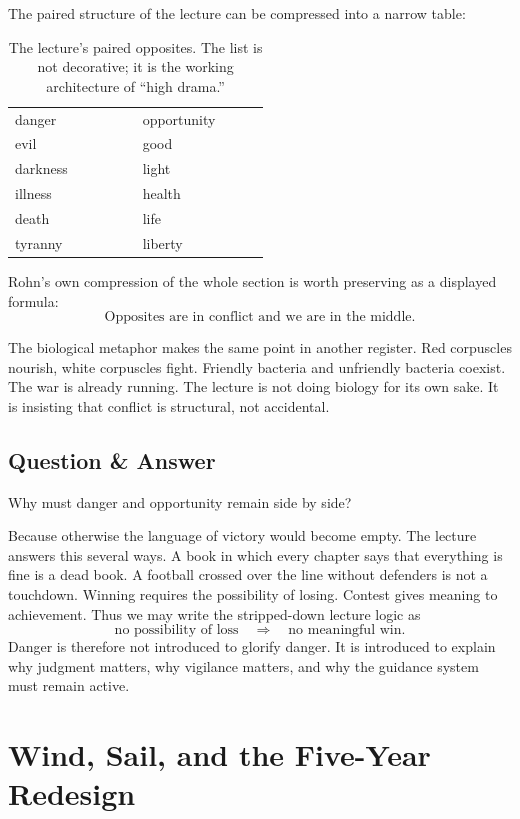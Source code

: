 The paired structure of the lecture can be compressed into a narrow table:
\begin{table}[h]
\centering
\begin{tabular}{p{0.34\linewidth} p{0.34\linewidth}}
danger & opportunity \\
evil & good \\
darkness & light \\
illness & health \\
death & life \\
tyranny & liberty
\end{tabular}
\caption{The lecture's paired opposites. The list is not decorative; it is the working architecture of ``high drama.''}
\end{table}

Rohn's own compression of the whole section is worth preserving as a displayed formula:
\begin{equation}
\text{Opposites are in conflict and we are in the middle.}
\end{equation}

The biological metaphor makes the same point in another register. Red corpuscles nourish, white corpuscles fight. Friendly bacteria and unfriendly bacteria coexist. The war is already running. The lecture is not doing biology for its own sake. It is insisting that conflict is structural, not accidental.

\subsection{Question \& Answer}

Why must danger and opportunity remain side by side?

Because otherwise the language of victory would become empty. The lecture answers this several ways. A book in which every chapter says that everything is fine is a dead book. A football crossed over the line without defenders is not a touchdown. Winning requires the possibility of losing. Contest gives meaning to achievement. Thus we may write the stripped-down lecture logic as
\begin{equation}
\text{no possibility of loss} \quad \Rightarrow \quad \text{no meaningful win}.
\end{equation}
Danger is therefore not introduced to glorify danger. It is introduced to explain why judgment matters, why vigilance matters, and why the guidance system must remain active.

\section{Wind, Sail, and the Five-Year Redesign}

